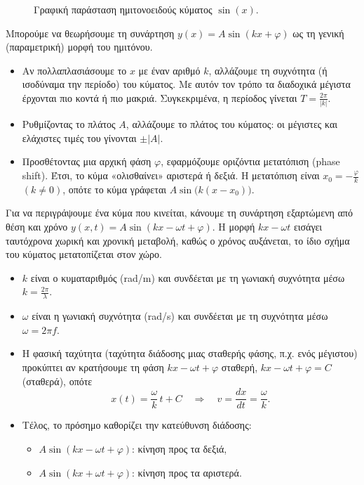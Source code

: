 \documentclass[a4paper, 11pt]{article}
\begin{document}
\begin{figure}[htbp]
\centering
{}
\caption{Γραφική παράσταση ημιτονοειδούς κύματος $\sin(x)$.}
\label{fig:sinx}
\end{figure}

Μπορούμε να θεωρήσουμε τη συνάρτηση \(y(x)=A\sin(kx+\varphi)\) ως τη
γενική (παραμετρική) μορφή του ημιτόνου.

\begin{itemize}
\item
  Αν πολλαπλασιάσουμε το \(x\) με έναν αριθμό \(k\), αλλάζουμε τη
  συχνότητα (ή ισοδύναμα την περίοδο) του κύματος. Με αυτόν τον τρόπο τα
  διαδοχικά μέγιστα έρχονται πιο κοντά ή πιο μακριά. Συγκεκριμένα, η
  περίοδος γίνεται \(T=\frac{2\pi}{|k|}\).
\item
  Ρυθμίζοντας το πλάτος \(A\), αλλάζουμε το πλάτος του κύματος: οι
  μέγιστες και ελάχιστες τιμές του γίνονται \(\pm|A|\).
\item
  Προσθέτοντας μια αρχική φάση \(\varphi\), εφαρμόζουμε οριζόντια
  μετατόπιση (phase shift). Έτσι, το κύμα «ολισθαίνει» αριστερά ή δεξιά.
  Η μετατόπιση είναι \(x_0=-\frac{\varphi}{k}\) \((k\neq 0)\), οπότε το
  κύμα γράφεται \(A\sin\bigl(k(x-x_0)\bigr)\).
\end{itemize}

Για να περιγράψουμε ένα κύμα που κινείται, κάνουμε τη συνάρτηση
εξαρτώμενη από θέση και χρόνο \(y(x,t)=A\sin(kx-\omega t + \varphi)\). Η
μορφή \(kx-\omega t\) εισάγει ταυτόχρονα χωρική και χρονική μεταβολή,
καθώς ο χρόνος αυξάνεται, το ίδιο σχήμα του κύματος μετατοπίζεται στον
χώρο.

\begin{itemize}
\item
  \(k\) είναι ο κυματαριθμός (rad/m) και συνδέεται με τη γωνιακή
  συχνότητα μέσω \(k=\frac{2\pi}{\lambda}\).
\item
  \(\omega\) είναι η γωνιακή συχνότητα (rad/s) και συνδέεται με τη
  συχνότητα μέσω \(\omega=2\pi f\).
\item
  Η φασική ταχύτητα (ταχύτητα διάδοσης μιας σταθερής φάσης, π.χ. ενός
  μέγιστου) προκύπτει αν κρατήσουμε τη φάση \(kx-\omega t+\varphi\)
  σταθερή, \(kx-\omega t+\varphi = C\) (σταθερά), οπότε \[
  x(t)=\frac{\omega}{k}\,t+C
  \quad\Rightarrow\quad
  v=\frac{dx}{dt}=\frac{\omega}{k}.
  \]
\item
  Τέλος, το πρόσημο καθορίζει την κατεύθυνση διάδοσης:

  \begin{itemize}
  \item
    \(A\sin(kx-\omega t+\varphi)\): κίνηση προς τα δεξιά,
  \item
    \(A\sin(kx+\omega t+\varphi)\): κίνηση προς τα αριστερά.
  \end{itemize}
\end{itemize}
\end{document}
